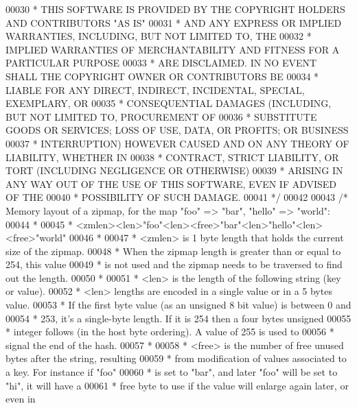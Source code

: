 \begin{DoxyCode}
00030 \textcolor{comment}{ * THIS SOFTWARE IS PROVIDED BY THE COPYRIGHT HOLDERS AND CONTRIBUTORS "AS IS"}
00031 \textcolor{comment}{ * AND ANY EXPRESS OR IMPLIED WARRANTIES, INCLUDING, BUT NOT LIMITED TO, THE}
00032 \textcolor{comment}{ * IMPLIED WARRANTIES OF MERCHANTABILITY AND FITNESS FOR A PARTICULAR PURPOSE}
00033 \textcolor{comment}{ * ARE DISCLAIMED. IN NO EVENT SHALL THE COPYRIGHT OWNER OR CONTRIBUTORS BE}
00034 \textcolor{comment}{ * LIABLE FOR ANY DIRECT, INDIRECT, INCIDENTAL, SPECIAL, EXEMPLARY, OR}
00035 \textcolor{comment}{ * CONSEQUENTIAL DAMAGES (INCLUDING, BUT NOT LIMITED TO, PROCUREMENT OF}
00036 \textcolor{comment}{ * SUBSTITUTE GOODS OR SERVICES; LOSS OF USE, DATA, OR PROFITS; OR BUSINESS}
00037 \textcolor{comment}{ * INTERRUPTION) HOWEVER CAUSED AND ON ANY THEORY OF LIABILITY, WHETHER IN}
00038 \textcolor{comment}{ * CONTRACT, STRICT LIABILITY, OR TORT (INCLUDING NEGLIGENCE OR OTHERWISE)}
00039 \textcolor{comment}{ * ARISING IN ANY WAY OUT OF THE USE OF THIS SOFTWARE, EVEN IF ADVISED OF THE}
00040 \textcolor{comment}{ * POSSIBILITY OF SUCH DAMAGE.}
00041 \textcolor{comment}{ */}
00042 
00043 \textcolor{comment}{/* Memory layout of a zipmap, for the map "foo" => "bar", "hello" => "world":}
00044 \textcolor{comment}{ *}
00045 \textcolor{comment}{ * <zmlen><len>"foo"<len><free>"bar"<len>"hello"<len><free>"world"}
00046 \textcolor{comment}{ *}
00047 \textcolor{comment}{ * <zmlen> is 1 byte length that holds the current size of the zipmap.}
00048 \textcolor{comment}{ * When the zipmap length is greater than or equal to 254, this value}
00049 \textcolor{comment}{ * is not used and the zipmap needs to be traversed to find out the length.}
00050 \textcolor{comment}{ *}
00051 \textcolor{comment}{ * <len> is the length of the following string (key or value).}
00052 \textcolor{comment}{ * <len> lengths are encoded in a single value or in a 5 bytes value.}
00053 \textcolor{comment}{ * If the first byte value (as an unsigned 8 bit value) is between 0 and}
00054 \textcolor{comment}{ * 253, it's a single-byte length. If it is 254 then a four bytes unsigned}
00055 \textcolor{comment}{ * integer follows (in the host byte ordering). A value of 255 is used to}
00056 \textcolor{comment}{ * signal the end of the hash.}
00057 \textcolor{comment}{ *}
00058 \textcolor{comment}{ * <free> is the number of free unused bytes after the string, resulting}
00059 \textcolor{comment}{ * from modification of values associated to a key. For instance if "foo"}
00060 \textcolor{comment}{ * is set to "bar", and later "foo" will be set to "hi", it will have a}
00061 \textcolor{comment}{ * free byte to use if the value will enlarge again later, or even in}

\end{DoxyCode}
